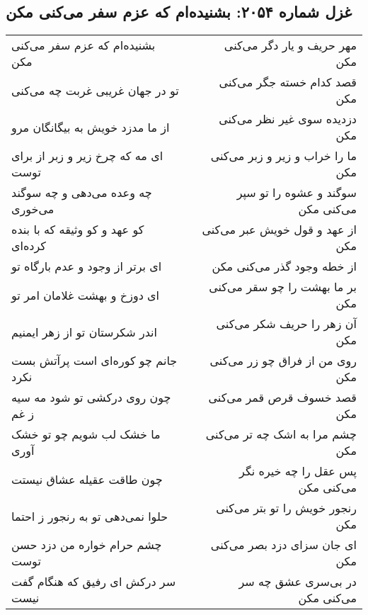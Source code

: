 \begin{center}
\section*{غزل شماره ۲۰۵۴: بشنیده‌ام که عزم سفر می‌کنی مکن}
\label{sec:2054}
\begin{longtable}{l p{0.5cm} r}
بشنیده‌ام که عزم سفر می‌کنی مکن
&&
مهر حریف و یار دگر می‌کنی مکن
\\
تو در جهان غریبی غربت چه می‌کنی
&&
قصد کدام خسته جگر می‌کنی مکن
\\
از ما مدزد خویش به بیگانگان مرو
&&
دزدیده سوی غیر نظر می‌کنی مکن
\\
ای مه که چرخ زیر و زبر از برای توست
&&
ما را خراب و زیر و زبر می‌کنی مکن
\\
چه وعده می‌دهی و چه سوگند می‌خوری
&&
سوگند و عشوه را تو سپر می‌کنی مکن
\\
کو عهد و کو وثیقه که با بنده کرده‌ای
&&
از عهد و قول خویش عبر می‌کنی مکن
\\
ای برتر از وجود و عدم بارگاه تو
&&
از خطه وجود گذر می‌کنی مکن
\\
ای دوزخ و بهشت غلامان امر تو
&&
بر ما بهشت را چو سقر می‌کنی مکن
\\
اندر شکرستان تو از زهر ایمنیم
&&
آن زهر را حریف شکر می‌کنی مکن
\\
جانم چو کوره‌ای است پرآتش بست نکرد
&&
روی من از فراق چو زر می‌کنی مکن
\\
چون روی درکشی تو شود مه سیه ز غم
&&
قصد خسوف قرص قمر می‌کنی مکن
\\
ما خشک لب شویم چو تو خشک آوری
&&
چشم مرا به اشک چه تر می‌کنی مکن
\\
چون طاقت عقیله عشاق نیستت
&&
پس عقل را چه خیره نگر می‌کنی مکن
\\
حلوا نمی‌دهی تو به رنجور ز احتما
&&
رنجور خویش را تو بتر می‌کنی مکن
\\
چشم حرام خواره من دزد حسن توست
&&
ای جان سزای دزد بصر می‌کنی مکن
\\
سر درکش ای رفیق که هنگام گفت نیست
&&
در بی‌سری عشق چه سر می‌کنی مکن
\\
\end{longtable}
\end{center}
